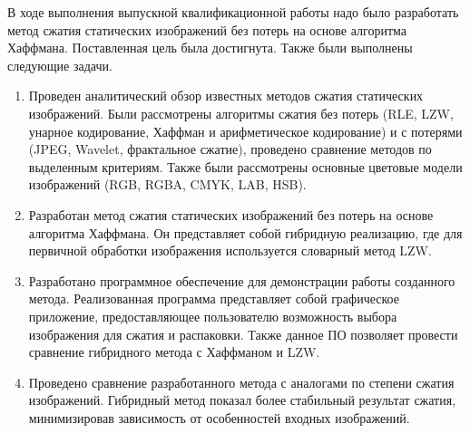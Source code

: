 \conclusion

В ходе выполнения выпускной квалификационной работы надо было разработать метод сжатия статических изображений без потерь на основе алгоритма Хаффмана. Поставленная цель была достигнута. Также были выполнены следующие задачи.

\begin{enumerate}
  \item Проведен аналитический обзор известных методов сжатия статических изображений. Были рассмотрены алгоритмы сжатия без потерь (RLE, LZW, унарное кодирование, Хаффман и арифметическое кодирование) и с потерями (JPEG, Wavelet, фрактальное сжатие), проведено сравнение методов по выделенным критериям. Также были рассмотрены основные цветовые модели изображений (RGB, RGBA, CMYK, LAB, HSB).
  \item Разработан метод сжатия статических изображений без потерь на основе алгоритма Хаффмана. Он представляет собой гибридную реализацию, где для первичной обработки изображения используется словарный метод LZW.
  \item Разработано программное обеспечение для демонстрации работы созданного метода. Реализованная программа представляет собой графическое приложение, предоставляющее пользователю возможность выбора изображения для сжатия и распаковки. Также данное ПО позволяет провести сравнение гибридного метода с Хаффманом и LZW.
  \item Проведено сравнение разработанного метода с аналогами по степени сжатия изображений. Гибридный метод показал более стабильный результат сжатия, минимизировав зависимость от особенностей входных изображений.
\end{enumerate}
